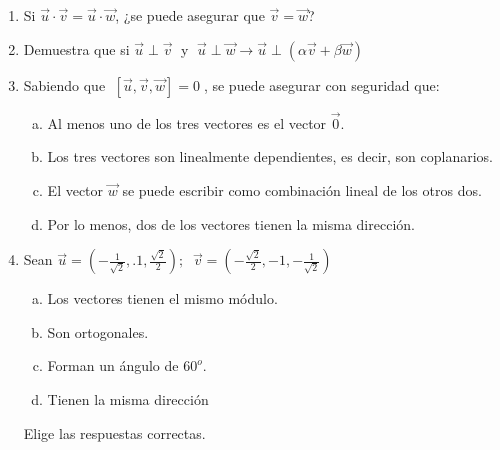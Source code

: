 \begin{enumerate}[Q1. ]

\item Si $\vec u \cdot \vec v=\vec u \cdot \vec w$, ¿se puede asegurar que $\vec v=\vec w$?




\item Demuestra que si $\vec u \;\bot \;\vec v\; $ y $\; \vec u\; \bot \;\vec w \longrightarrow \vec u \; \bot \;(\alpha \vec v + \beta \vec w)$




\item Sabiendo que $\;[\vec u, \vec v, \vec w]=0\;$, se puede asegurar con seguridad que:
\begin{multicols}{2}
\begin{enumerate}[a) ]
\item Al menos uno de los tres vectores es el vector $\vec 0$.
\item Los tres vectores son linealmente dependientes, es decir, son coplanarios.
\item El vector $\vec w$ se puede escribir como combinación lineal de los otros dos.
\item Por lo menos, dos de los vectores tienen la misma dirección.
\end{enumerate}
\end{multicols}


\item Sean $\vec u=\left( -\frac 1 {\sqrt{2}},.1,\frac {\sqrt{2}}2\right); \;\; \vec v=\left( -\frac {\sqrt{2}}2, -1,-\frac 1 {\sqrt{2}} \right)$

\begin{multicols}{2}
\begin{enumerate}[a) ]
\item Los vectores tienen el mismo módulo.
\item Son ortogonales.
\item Forman un ángulo de $60^o$.
\item Tienen la misma dirección
\end{enumerate}
\end{multicols}
Elige las respuestas correctas.


\end{enumerate}

